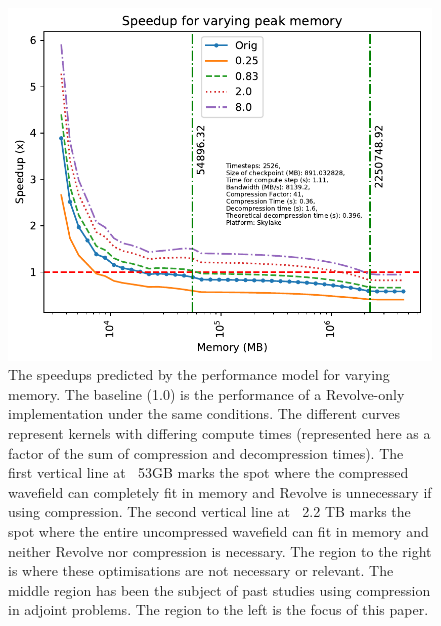 \begin{figure}
\begin{center}
\includegraphics[width=0.9\linewidth]{images/varying-memory.pdf}
\end{center}
\caption{The speedups predicted by the performance model for varying
  memory. The baseline
(1.0) is the performance of a Revolve-only implementation under the
same conditions. The different curves represent kernels with differing
compute times (represented here as a factor of the sum of compression
and decompression times). The first vertical line at $~$ 53GB marks the
spot where the compressed wavefield can completely fit in memory and
Revolve is unnecessary if using compression. The second vertical line
at $~$ 2.2 TB marks the spot where the entire uncompressed wavefield can
fit in memory and neither Revolve nor compression is necessary. The
region to the right is where these optimisations are not necessary or
relevant. The middle region has been the subject of past studies using
compression in adjoint problems. The region to the left is the focus
of this paper.}
\label{fig:varying_memory}
\end{figure}

